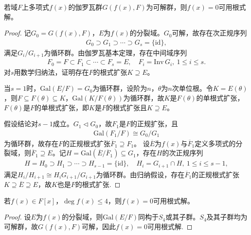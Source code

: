 \documentclass[../../main.tex]{subfiles}%
\begin{document}
\begin{theorem}
若域$F$上多项式$f(x)$的伽罗瓦群$G(f(x),F)$为可解群，则$f(x)=0$可用根式解。
\end{theorem}
\begin{proof}

记$G_0=G(f(x),F)$，$E$为$f(x)$的分裂域。$G_0$可解，故存在次正规序列
\begin{align*}
G_0\supset G_1\supset\cdots\supset G_s=\{\mathrm{id}\},
\end{align*}
满足$G_i/G_{i+1}$为循环群。由伽罗瓦基本定理，存在中间域序列
\begin{align*}
F_0=F\subset F_1\subset\cdots\subset F_s=E,\quad F_i=\mathrm{Inv}\,G_i,\ 1\leqslant i\leqslant s.
\end{align*}
对$s$用数学归纳法，证明存在$F$的根式扩张$K\supseteq E$。

当$s=1$时，$\mathrm{Gal}(E/F)=G_0$为循环群，设阶为$n$，$\theta$为$n$次单位根。令$K=E(\theta)$，则$F\subseteq F(\theta)\subseteq K$，$\mathrm{Gal}(K/F(\theta))$为循环群，故$K$是$F(\theta)$的单根式扩张，$F(\theta)$是$F$的单根式扩张，即$K$是$F$的根式扩张且$K\supseteq E$。

假设结论对$s-1$成立。$G_1\triangleleft G_0$，故$F_1$是$F$的正规扩张，且
\begin{align*}
\mathrm{Gal}(F_1/F)\cong G_0/G_1
\end{align*}
为循环群，故存在$F$的正规根式扩张$\overline{F}_1\supseteq F_1$。
设$\overline{E}$为$f(x)$与$\overline{F}_1$定义多项式的分裂域，则$\overline{F}_1\supseteq E$。记$H=\mathrm{Gal}(\overline{E}/\overline{F}_1)\subseteq G_1$，存在$H$的次正规序列
\begin{align*}
H=H_0\supset H_1\supset\cdots\supset H_{s-1}=\{\mathrm{id}\},\quad H_i=G_{i+1}\cap H,\ 1\leqslant i\leqslant s-1,
\end{align*}
满足$H_i/H_{i+1}\cong H_iG_{i+1}/G_{i+1}$为循环群。由归纳假设，存在$\overline{F}_1$的正规根式扩张$K\supseteq\overline{E}\supseteq E$，故$K$也是$F$的根式扩张.

\end{proof}

\begin{corollary}
若$f(x)\in F[x]$，$\deg f(x)\leqslant4$，则$f(x)=0$可用根式解。
\end{corollary}
\begin{proof}

设$E$为$f(x)$的分裂域，则$\mathrm{Gal}(E/F)$同构于$S_4$或其子群。$S_4$及其子群均为可解群，故$G(f(x),F)$可解，因此$f(x)=0$可用根式解.

\end{proof}
\end{document}
